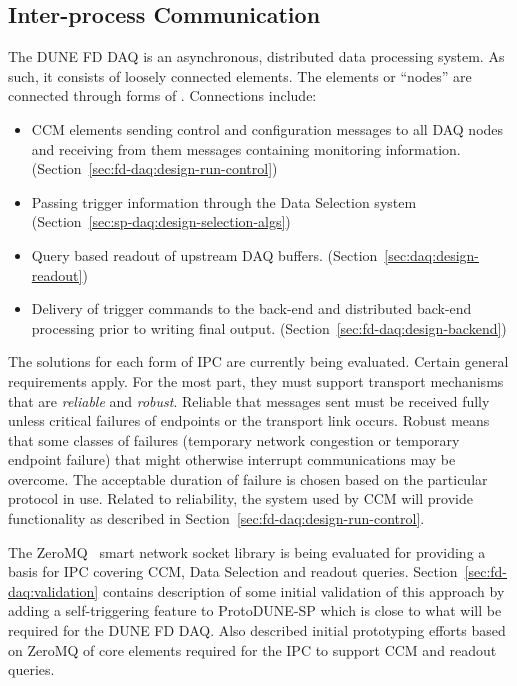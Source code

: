 

\subsection{Inter-process Communication}
\label{sec:daq:design-ipc}

The DUNE FD DAQ is an asynchronous, distributed data processing system. 
As such, it consists of loosely connected elements.
The elements or ``nodes'' are connected through forms of .
Connections include:

\begin{itemize}
\item CCM elements sending control and configuration messages to all DAQ nodes and receiving from them messages containing monitoring information.  (Section~\ref{sec:fd-daq:design-run-control})
\item Passing trigger information through the Data Selection system (Section~\ref{sec:sp-daq:design-selection-algs})
\item Query based readout of upstream DAQ buffers. (Section~\ref{sec:daq:design-readout})
\item Delivery of trigger commands to the back-end and distributed back-end processing prior to writing final output. (Section~\ref{sec:fd-daq:design-backend})
\end{itemize}

The solutions for each form of IPC are currently being evaluated. 
Certain general requirements apply.
For the most part, they must support transport mechanisms that are \textit{reliable} and \textit{robust}. 
Reliable that messages sent must be received fully unless critical failures of endpoints or the transport link occurs.  Robust means that some classes of failures (temporary network congestion or temporary endpoint failure) that might otherwise interrupt communications may be overcome.
The acceptable duration of failure is chosen based on the particular protocol in use.
Related to reliability, the   system used by CCM will provide  functionality as described in Section~\ref{sec:fd-daq:design-run-control}.

The ZeroMQ~\cite{zeromq} smart network socket library is being evaluated for providing a basis for IPC covering CCM, Data Selection and readout queries.  
Section~\ref{sec:fd-daq:validation} contains description of some initial validation of this approach by adding a self-triggering feature to ProtoDUNE-SP which is close to what will be required for the DUNE FD DAQ.  Also described initial prototyping efforts based on ZeroMQ of core elements required for the IPC to support CCM and readout queries.

